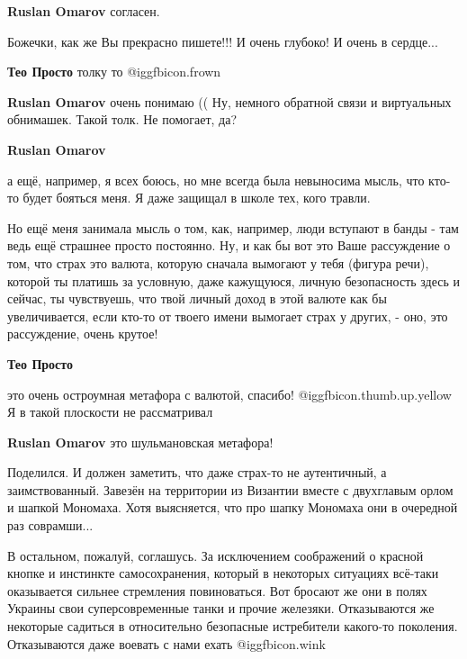 \begin{itemize}
\begin{itemize}
\textbf{Ruslan Omarov} согласен.
\end{itemize} %

Божечки, как же Вы прекрасно пишете!!! И очень глубоко! И очень в сердце...

\begin{itemize} %
\textbf{Тео Просто} толку то  @igg{fbicon.frown} 

\textbf{Ruslan Omarov} очень понимаю ((
Ну, немного обратной связи и виртуальных обнимашек. Такой толк. Не помогает, да?

\textbf{Ruslan Omarov} 

а ещё, например, я всех боюсь, но мне всегда была невыносима мысль, что кто-то
будет бояться меня. Я даже защищал в школе тех, кого травли.

Но ещё меня занимала мысль о том, как, например, люди вступают в банды - там
ведь ещё страшнее просто постоянно. Ну, и как бы вот это Ваше рассуждение о
том, что страх это валюта, которую сначала вымогают у тебя (фигура речи),
которой ты платишь за условную, даже кажущуюся, личную безопасность здесь и
сейчас, ты чувствуешь, что твой личный доход в этой валюте как бы
увеличивается, если кто-то от твоего имени вымогает страх у других, - оно, это
рассуждение, очень крутое!

\textbf{Тео Просто} 

это очень остроумная метафора с валютой, спасибо!  @igg{fbicon.thumb.up.yellow}
Я в такой плоскости не рассматривал

\textbf{Ruslan Omarov} это шульмановская метафора!
\end{itemize} %


Поделился. И должен заметить, что даже страх-то не аутентичный, а
заимствованный. Завезён на территории из Византии вместе с двухглавым орлом и
шапкой Мономаха. Хотя выясняется, что про шапку Мономаха они в очередной раз
соврамши...

В остальном, пожалуй, соглашусь. За исключением соображений о красной кнопке и
инстинкте самосохранения, который в некоторых ситуациях всё-таки оказывается
сильнее стремления повиноваться. Вот бросают же они в полях Украины свои
суперсовременные танки и прочие железяки. Отказываются же некоторые садиться в
относительно безопасные истребители какого-то поколения. Отказываются даже
воевать с нами ехать  @igg{fbicon.wink} 


\end{itemize}
